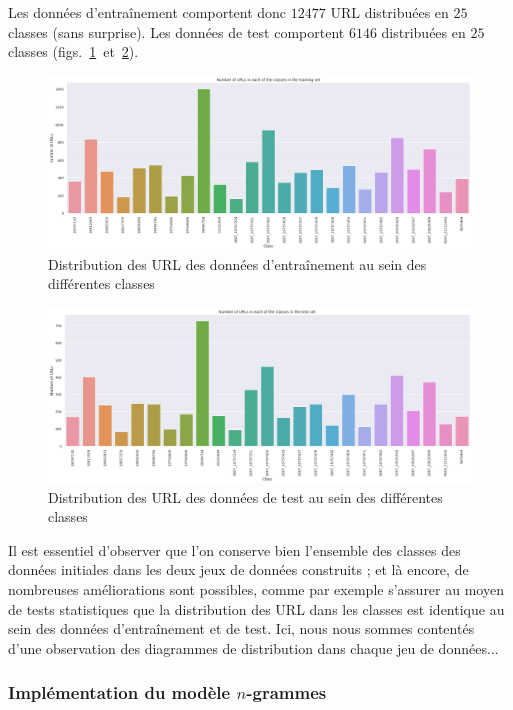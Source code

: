 \documentclass[11pt, a4paper]{article}
\begin{document}
Les données d'entraînement comportent donc $12477$ URL distribuées en $25$ classes (sans surprise). Les données de test comportent $6146$ distribuées en $25$ classes (figs.~\ref{distribution_train}~et~\ref{distribution_test}).

\begin{figure}[!h]
	\center
	\includegraphics[scale=0.29]{distribution_train.png}
	\caption{Distribution des URL des données d'entraînement au sein des différentes classes}
	\label{distribution_train}
\end{figure}

\begin{figure}[!h]
	\center
	\includegraphics[scale=0.29]{distribution_test.png}
	\caption{Distribution des URL des données de test au sein des différentes classes}
	\label{distribution_test}
\end{figure}

Il est essentiel d'observer que l'on conserve bien l'ensemble des classes des données initiales dans les deux jeux de données construits ; et là encore, de nombreuses améliorations sont possibles, comme par exemple s'assurer au moyen de tests statistiques que la distribution des URL dans les classes est identique au sein des données d'entraînement et de test. Ici, nous nous sommes contentés d'une observation des diagrammes de distribution dans chaque jeu de données...

\subsubsection{Implémentation du modèle $n$-grammes}
\end{document}
